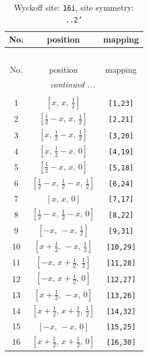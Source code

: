 \documentclass[fleqn,8pt]{jsarticle}
\begin{document}
\begin{longtable}{ccc}
\caption{Wyckoff site: {\tt 16i}, site symmetry: {\tt ..2'}}
 \\
 \hline \hline
No. & position & mapping \\ \hline \endfirsthead

\multicolumn{2}{l}{\tablename\ \thetable{}} \\
 \hline \hline
No. & position & mapping \\ \hline \endhead

 \hline \hline
\multicolumn{2}{r}{\footnotesize\it continued ...} \\ \endfoot

 \hline \hline
\multicolumn{2}{r}{} \\ \endlastfoot

1 & $\left[ x,\, x,\, \frac{1}{2} \right]$ & {\tt [1,23]} \\ \hline
2 & $\left[ \frac{1}{2} - x,\, x,\, \frac{1}{2} \right]$ & {\tt [2,21]} \\ \hline
3 & $\left[ x,\, \frac{1}{2} - x,\, \frac{1}{2} \right]$ & {\tt [3,20]} \\ \hline
4 & $\left[ x,\, \frac{1}{2} - x,\, 0 \right]$ & {\tt [4,19]} \\ \hline
5 & $\left[ \frac{1}{2} - x,\, x,\, 0 \right]$ & {\tt [5,18]} \\ \hline
6 & $\left[ \frac{1}{2} - x,\, \frac{1}{2} - x,\, \frac{1}{2} \right]$ & {\tt [6,24]} \\ \hline
7 & $\left[ x,\, x,\, 0 \right]$ & {\tt [7,17]} \\ \hline
8 & $\left[ \frac{1}{2} - x,\, \frac{1}{2} - x,\, 0 \right]$ & {\tt [8,22]} \\ \hline
9 & $\left[ - x,\, - x,\, \frac{1}{2} \right]$ & {\tt [9,31]} \\ \hline
10 & $\left[ x + \frac{1}{2},\, - x,\, \frac{1}{2} \right]$ & {\tt [10,29]} \\ \hline
11 & $\left[ - x,\, x + \frac{1}{2},\, \frac{1}{2} \right]$ & {\tt [11,28]} \\ \hline
12 & $\left[ - x,\, x + \frac{1}{2},\, 0 \right]$ & {\tt [12,27]} \\ \hline
13 & $\left[ x + \frac{1}{2},\, - x,\, 0 \right]$ & {\tt [13,26]} \\ \hline
14 & $\left[ x + \frac{1}{2},\, x + \frac{1}{2},\, \frac{1}{2} \right]$ & {\tt [14,32]} \\ \hline
15 & $\left[ - x,\, - x,\, 0 \right]$ & {\tt [15,25]} \\ \hline
16 & $\left[ x + \frac{1}{2},\, x + \frac{1}{2},\, 0 \right]$ & {\tt [16,30]} \\
\end{longtable}
\end{document}
